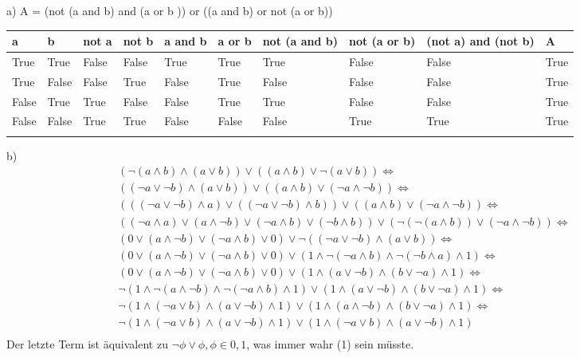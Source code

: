\documentclass[11pt]{article}
\date{\today}
\title{}
\begin{document}
a)
A = (not (a and b) and (a or b )) or ((a and b) or not (a or b))


\begin{center}
\begin{tabular}{llllllllll}
a & b & not a & not b & a and b & a or b & not (a and b) & not (a or b) & (not a) and (not b) & A\\
\hline
True & True & False & False & True & True & True & False & False & True\\
True & False & False & True & False & True & False & False & False & True\\
False & True & True & False & False & True & True & False & False & True\\
False & False & True & True & False & False & False & True & True & True\\
 &  &  &  &  &  &  &  &  & \\
\end{tabular}
\end{center}

b)
\begin{align*}
  (\neg(a\land b) \land (a \lor b)) \lor ((a\land b) \lor \neg (a \lor b)) \Leftrightarrow&\\ 
  ((\neg a \lor \neg b) \land (a \lor b)) \lor ((a \land b) \lor (\neg a \land \neg b)) \Leftrightarrow&\\
(((\neg a \lor \neg b)\land a) \lor ((\neg a \lor \neg b)\land b)) \lor ((a \land b ) \lor (\neg a \land \neg b)) \Leftrightarrow&\\
  ((\neg a \land a )\lor (a \land \neg b) \lor (\neg a \land b) \lor (\neg b \land b)) \lor (\neg(\neg(a\land b)) \lor (\neg a \land \neg b)) \Leftrightarrow&\\
 (0 \lor (a \land \neg b ) \lor (\neg a \land b) \lor 0) \lor \neg((\neg a \lor \neg b) \land (a \lor b)) \Leftrightarrow&\\
 (0 \lor (a \land \neg b ) \lor (\neg a \land b) \lor 0) \lor (1 \land \neg(\neg a \land b) \land \neg(\neg b \land a) \land 1)\Leftrightarrow&\\
 (0 \lor (a \land \neg b ) \lor (\neg a \land b) \lor 0) \lor (1 \land ( a \lor \neg b) \land (b \lor \neg a) \land 1)\Leftrightarrow& \\
 \neg(1 \land \neg (a \land \neg b) \land \neg(\neg a \land b) \land 1) \lor  (1 \land ( a \lor \neg b) \land (b \lor \neg a) \land 1) \Leftrightarrow&\\
 \neg(1 \land (\neg a \lor b) \land (a \lor \neg b) \land 1) \lor (1 \land (a \land \neg b) \land (b \lor \neg a) \land 1) \Leftrightarrow&\\
 \neg(1 \land (\neg a \lor b) \land (a \lor \neg b) \land 1) \lor (1 \land (\neg a \lor b) \land ( a \lor \neg b )\land 1)\\
\end{align*}
Der letzte Term ist äquivalent zu \(\neg \phi \lor \phi, \phi \in {0,1}\), was immer wahr (1) sein müsste.
\end{document}
